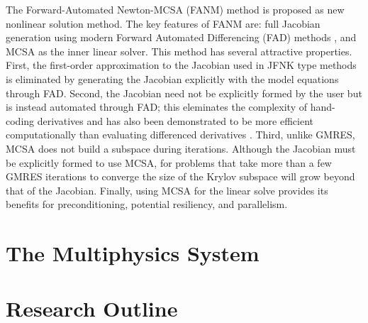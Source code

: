 The Forward-Automated Newton-MCSA (FANM) method is proposed as new
nonlinear solution method. The key features of FANM are: full Jacobian
generation using modern Forward Automated Differencing (FAD) methods
\citep{hutchison_automatic_2006}, and MCSA as the inner linear
solver. This method has several attractive properties. First, the
first-order approximation to the Jacobian used in JFNK type methods is
eliminated by generating the Jacobian explicitly with the model
equations through FAD. Second, the Jacobian need not be explicitly
formed by the user but is instead automated through FAD; this
eleminates the complexity of hand-coding derivatives and has also been
demonstrated to be more efficient computationally than evaluating
differenced derivatives \citep{hutchison_automatic_2006}. Third,
unlike GMRES, MCSA does not build a subspace during
iterations. Although the Jacobian must be explicitly formed to use
MCSA, for problems that take more than a few GMRES iterations to
converge the size of the Krylov subspace will grow beyond that of the
Jacobian. Finally, using MCSA for the linear solve provides its
benefits for preconditioning, potential resiliency, and parallelism.

\section{The Multiphysics System}
\label{sec:multiphysics_system}

\section{Research Outline}
\label{sec:research_outline}
